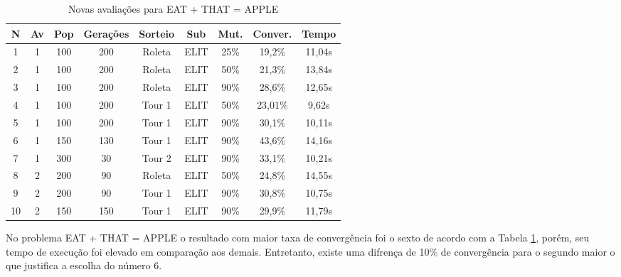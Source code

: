 \documentclass[a4paper, 12pt]{article}
\begin{document}
  \begin{table}[H]
    \centering
    \begin{tabular}{|c|c|c|c|c|c|c|c|c|}
      \hline
      N & Av & Pop & Gerações & Sorteio & Sub & Mut. & Conver. & Tempo  \\
      \hline
      1 & 1 & 100 & 200 & Roleta & ELIT & 25\% &19,2\% & 11,04s \\
      \hline
      2 & 1 & 100 & 200 & Roleta & ELIT & 50\% &21,3\% & 13,84s \\
      \hline
      3 & 1 & 100 & 200 & Roleta & ELIT & 90\% &28,6\% & 12,65s \\
      \hline
      4 & 1 & 100 & 200 & Tour 1 & ELIT & 50\% &23,01\% & 9,62s \\
      \hline
      5 & 1 & 100 & 200 & Tour 1 & ELIT & 90\% &30,1\% & 10,11s \\
      \hline
      6 & 1 & 150 & 130 & Tour 1 & ELIT & 90\% &43,6\% & 14,16s \\
      \hline
      7 & 1 & 300 & 30 & Tour 2 & ELIT & 90\% &33,1\% &10,21s \\
      \hline
      8 & 2 & 200 & 90 & Roleta & ELIT & 50\% &24,8\% & 14,55s \\
      \hline
      9 & 2 & 200 & 90 & Tour 1 & ELIT & 90\% &30,8\% & 10,75s \\
      \hline
      10& 2 & 150 & 150 & Tour 1 & ELIT & 90\% &29,9\% & 11,79s \\
      \hline
    \end{tabular}
    \caption{Novas avaliações para EAT + THAT = APPLE}
    \label{tab:eat}
  \end{table}

  No problema EAT + THAT = APPLE o resultado com maior taxa de convergência foi
  o sexto de acordo com a Tabela \ref{tab:eat}, porém,  seu tempo de execução
  foi elevado em comparação aos demais. Entretanto, existe
  uma difrença de 10\% de convergência para o segundo maior o que justifica a
  escolha do número 6.
\end{document}
